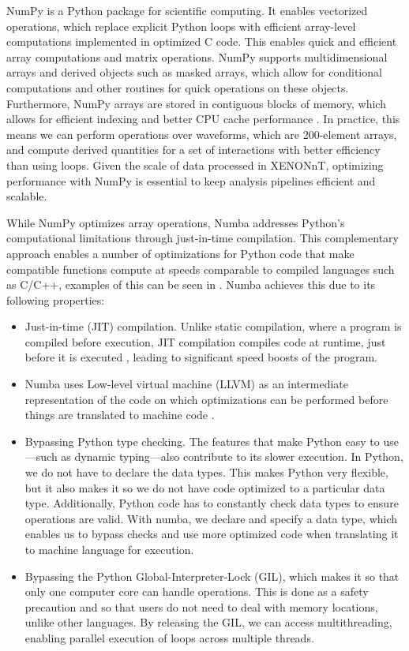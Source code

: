 NumPy is a Python package for scientific computing. It enables vectorized operations, which replace explicit Python loops with efficient array-level computations implemented in optimized C code. This enables quick and efficient array computations and matrix operations. NumPy supports multidimensional arrays and derived objects such as masked arrays, which allow for conditional computations and other routines for quick operations on these objects. Furthermore, NumPy arrays are stored in contiguous blocks of memory, which allows for efficient indexing and better CPU cache performance \cite{numpy_docs}. In practice, this means we can perform operations over waveforms, which are 200-element arrays, and compute derived quantities for a set of interactions with better efficiency than using loops. Given the scale of data processed in XENONnT, optimizing performance with NumPy is essential to keep analysis pipelines efficient and scalable.

While NumPy optimizes array operations, Numba addresses Python's computational limitations through just-in-time compilation. This complementary approach enables a number of optimizations for Python code that make compatible functions compute at speeds comparable to compiled languages such as C/C++, examples of this can be seen in \cite{murillo_numba_vs_c, fua2020comparingpythongoc}. Numba achieves this due to its following properties:

\begin{itemize}
    \item Just-in-time (JIT) compilation. Unlike static compilation, where a program is compiled before execution, JIT compilation compiles code at runtime, just before it is executed \cite{history_of_jit}, leading to significant speed boosts of the program.
    \item Numba uses Low-level virtual machine (LLVM) as an intermediate representation of the code on which optimizations can be performed before things are translated to machine code \cite{murillo_numba_vs_c}.
    \item Bypassing Python type checking. The features that make Python easy to use—such as dynamic typing—also contribute to its slower execution. In Python, we do not have to declare the data types. This makes Python very flexible, but it also makes it so we do not have code optimized to a particular data type. Additionally, Python code has to constantly check data types to ensure operations are valid. With numba, we declare and specify a data type, which enables us to bypass checks and use more optimized code when translating it to machine language for execution.
    \item Bypassing the Python Global-Interpreter-Lock (GIL), which makes it so that only one computer core can handle operations. This is done as a safety precaution and so that users do not need to deal with memory locations, unlike other languages. By releasing the GIL, we can access multithreading, enabling parallel execution of loops across multiple threads.
\end{itemize}

